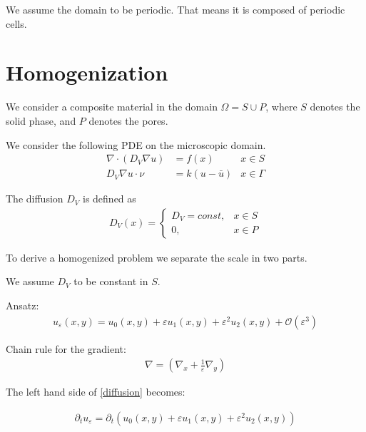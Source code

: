 \documentclass[10pt, a4paper]{article}
\begin{document}
 We assume the domain to be periodic. That means it is composed of periodic cells.
 
 \section{Homogenization}
 
 
 We consider a composite material in the domain $\Omega = S \cup P$, where $S$ denotes the solid phase, and $P$ denotes the pores. 
 
 We consider the following PDE  on the microscopic domain.
 \begin{align}
 \nabla \cdot (D_V\nabla u)  &= f(x)   & x\in S \label{diffusion}\\
 D_V\nabla u \cdot \nu &= k(u-\bar{u}) & x \in \Gamma \label{boundary condition}
 \end{align}
 
 The diffusion $D_V$ is defined as
 \begin{align*}
  D_V(x) = \begin{cases} D_V = const , & x \in S \\0  ,& x \in P\end{cases}
 \end{align*}
 
 To derive a homogenized problem we separate the scale in two parts.
 
 
 We assume $D_V$ to be constant in $S$.
 

 Ansatz:
\begin{align}
u_\varepsilon (x,y) = u_0(x,y) + \varepsilon u_1(x,y) + \varepsilon^2 u_2(x,y) + \mathcal{O} (\varepsilon^3)
\end{align}
 
 
 Chain rule for the gradient:
 \begin{align}
 \nabla = (\nabla_x + \frac{1}{\varepsilon} \nabla_y)
 \end{align}
 
 The left hand side of \eqref{diffusion} becomes:
 
 \begin{align}
 \partial_t u_\varepsilon =
 \partial_t \left( u_0(x,y) + \varepsilon u_1(x,y) + \varepsilon^2 u_2(x,y)\right)
 \end{align}
 
\end{document}
